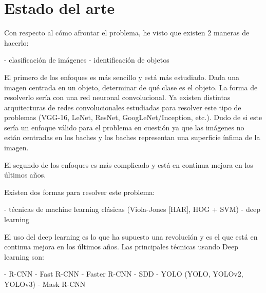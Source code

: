 \section{Estado del arte}


Con respecto al cómo afrontar el problema, he visto que existen 2 maneras de hacerlo:

- clasificación de imágenes
- identificación de objetos

El primero de los enfoques es más sencillo y está más estudiado. Dada una imagen centrada en un objeto, determinar de qué clase es el objeto. La forma de resolverlo sería con una red neuronal convolucional. Ya existen distintas arquitecturas de redes convolucionales estudiadas para resolver este tipo de problemas (VGG-16, LeNet, ResNet, GoogLeNet/Inception, etc.). Dudo de si este sería un enfoque válido para el problema en cuestión ya que las imágenes no están centradas en los baches y los baches representan una superficie ínfima de la imagen.

El segundo de los enfoques es más complicado y está en continua mejora en los últimos años.

Existen dos formas para resolver este problema:

- técnicas de machine learning clásicas (Viola-Jones [HAR], HOG + SVM)
- deep learning

El uso del deep learning es lo que ha supuesto una revolución y es el que está en continua mejora en los últimos años. Las principales técnicas usando Deep learning son:

- R-CNN
- Fast R-CNN
- Faster R-CNN
- SDD
- YOLO (YOLO, YOLOv2, YOLOv3)
- Mask R-CNN